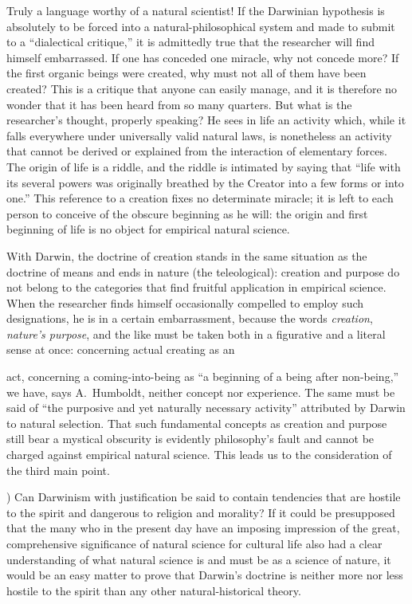 \documentclass[12pt,a4paper]{article}
\begin{document}
Truly a language worthy of a natural scientist! If the Darwinian
hypothesis is absolutely to be forced into a natural-philosophical
system and made to submit to a ``dialectical critique,'' it is
admittedly true that the researcher will find himself embarrassed. If
one has conceded one miracle, why not concede more? If the first
organic beings were created, why must not all of them have been
created? This is a critique that anyone can easily manage, and it is
therefore no wonder that it has been heard from so many quarters. But
what is the researcher's thought, properly speaking? He sees in life
an activity which, while it falls everywhere under universally valid
natural laws, is nonetheless an activity that cannot be derived or
explained from the interaction of elementary forces. The origin of
life is a riddle, and the riddle is intimated by saying that ``life
with its several powers was originally breathed by the Creator into a
few forms or into one.'' This reference to a creation fixes no
determinate miracle; it is left to each person to conceive of the
obscure beginning as he will: the origin and first beginning of life
is no object for empirical natural science.

With Darwin, the doctrine of creation stands in the same situation as
the doctrine of means and ends in nature (the teleological): creation
and purpose do not belong to the categories that find fruitful
application in empirical science. When the researcher finds himself
occasionally compelled to employ such designations, he is in a certain
embarrassment, because the words \emph{creation}, \emph{nature's
purpose}, and the like must be taken both in a figurative and a
literal sense at once: concerning actual creating as an

act, concerning a coming-into-being as ``a beginning of a being after
non-being,'' we have, says A.\ Humboldt, neither concept nor
experience. The same must be said of ``the purposive and yet
naturally necessary activity'' attributed by Darwin to natural
selection. That such fundamental concepts as creation and purpose
still bear a mystical obscurity is evidently philosophy's fault and
cannot be charged against empirical natural science. This leads us to
the consideration of the third main point.

\medskip

) Can Darwinism with justification be said to contain
tendencies that are hostile to the spirit and dangerous to religion
and morality? If it could be presupposed that the many who in the
present day have an imposing impression of the great, comprehensive
significance of natural science for cultural life also had a clear
understanding of what natural science is and must be as a science of
nature, it would be an easy matter to prove that Darwin's doctrine is
neither more nor less hostile to the spirit than any other
natural-historical theory.
\end{document}
